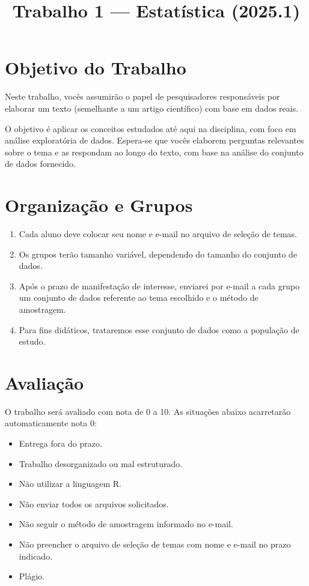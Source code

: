 \documentclass[12pt]{article}
\title{\textbf{Trabalho 1 — Estatística (2025.1)}}
\author{}
\date{}
\begin{document}
\maketitle
\onehalfspacing

\section*{Objetivo do Trabalho}

Neste trabalho, vocês assumirão o papel de pesquisadores responsáveis por elaborar um texto (semelhante a um artigo científico) com base em dados reais.

O objetivo é aplicar os conceitos estudados até aqui na disciplina, com foco em análise exploratória de dados. Espera-se que vocês elaborem perguntas relevantes sobre o tema e as respondam ao longo do texto, com base na análise do conjunto de dados fornecido.

\section*{Organização e Grupos}

\begin{enumerate}
    \item Cada aluno deve colocar seu nome e e-mail no arquivo de seleção de temas.
    \item Os grupos terão tamanho variável, dependendo do tamanho do conjunto de dados.
    \item Após o prazo de manifestação de interesse, enviarei por e-mail a cada grupo um conjunto de dados referente ao tema escolhido e o método de amostragem. 
    \item Para fins didáticos, trataremos esse conjunto de dados como a população de estudo.
\end{enumerate}

\section*{Avaliação}

O trabalho será avaliado com nota de 0 a 10. As situações abaixo acarretarão automaticamente nota 0:

\begin{itemize}
    \item Entrega fora do prazo.
    \item Trabalho desorganizado ou mal estruturado.
    \item Não utilizar a linguagem R.
    \item Não enviar todos os arquivos solicitados.
    \item Não seguir o método de amostragem informado no e-mail. 
    \item Não preencher o arquivo de seleção de temas com nome e e-mail no prazo indicado.
    \item Plágio. 
\end{itemize}
\end{document}
